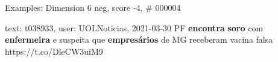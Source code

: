 \begin{frame}{Examples: Dimension 6 neg, score -4, \# 000004}
\footnotesize
\begin{alertblock}{text: t038933, user: UOLNoticias, 2021-03-30}
PF \textbf{encontra} \textbf{soro} com \textbf{enfermeira} e suspeita que 
\textbf{empresários} de MG receberam vacina falsa https://t.co/DleCW3uiM9 
\end{alertblock}
\end{frame}
